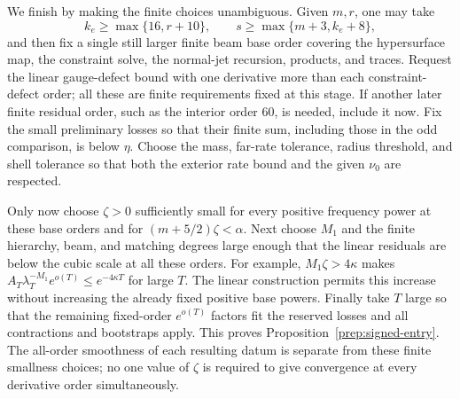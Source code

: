 We finish by making the finite choices unambiguous.  Given $m,r$,
one may take
\[
 k_e\ge\max\{16,r+10\},\qquad
 s\ge\max\{m+3,k_e+8\},
\]
and then fix a single still larger finite beam base order covering
the hypersurface map, the constraint solve, the normal-jet
recursion, products, and traces.  Request the linear gauge-defect
bound with one derivative more than each constraint-defect order;
all these are finite requirements fixed at this stage.  If another
later finite residual order, such as the interior order $60$, is
needed, include it now.  Fix the small preliminary losses so that
their finite sum, including those in the odd comparison, is below
$\eta$.  Choose the mass, far-rate tolerance, radius threshold,
and shell tolerance so that both the exterior rate bound and the
given $\nu_0$ are respected.

Only now choose $\zeta>0$ sufficiently small for every positive
frequency power at these base orders and for
$(m+5/2)\zeta<\alpha$.  Next choose $M_1$ and the finite hierarchy,
beam, and matching degrees large enough that the linear residuals
are below the cubic scale at all these orders.  For example,
$M_1\zeta>4\kappa$ makes
$A_T\lambda_T^{-M_1}e^{o(T)}\le e^{-4\kappa T}$ for large $T$.
The linear construction permits this increase without increasing
the already fixed positive base powers.  Finally take $T$ large
so that the remaining fixed-order $e^{o(T)}$ factors fit the
reserved losses and all contractions and bootstraps apply.
This proves Proposition~\ref{prep:signed-entry}.  The all-order
smoothness of each resulting datum is separate from these finite
smallness choices; no one value of $\zeta$ is required to give
convergence at every derivative order simultaneously.

